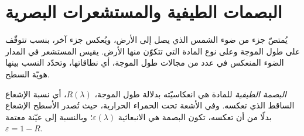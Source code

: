 \section{البصمات الطيفية والمستشعرات البصرية}\label{sec:b3:remote-sensing-gis:optical}

يُمتصّ جزء من ضوء الشمس الذي يصل إلى الأرض، ويُعكس جزء آخر،
بنسب تتوقّف على طول الموجة وعلى نوع المادة التي تتكوّن منها
الأرض. يقيس المستشعر في المدار الضوء المنعكس في عدد من مجالات طول
الموجة، أي نطاقاتها، وتحدّد النسب بينها
هويّة السطح.

\begin{definition}\label{def:b3:remote-sensing-gis:signature}
\emph{البصمة الطيفية} للمادة هي
انعكاسيّته بدلالة طول الموجة، $R(\lambda)$، أي نسبة
الإشعاع الساقط الذي تعكسه. وفي الأشعة تحت الحمراء الحرارية، حيث
تُصدر الأسطح الإشعاع بدلًا من أن تعكسه، تكون البصمة هي الانبعاثية
$\varepsilon(\lambda)$؛ وبالنسبة إلى عيّنة معتمة $\varepsilon = 1 - R$.
\end{definition}

